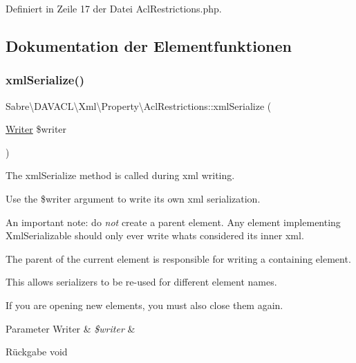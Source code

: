 Definiert in Zeile 17 der Datei Acl\+Restrictions.\+php.



\subsection{Dokumentation der Elementfunktionen}
\mbox{\label{class_sabre_1_1_d_a_v_a_c_l_1_1_xml_1_1_property_1_1_acl_restrictions_ab8c6081b610ad90690a1aca367a93ebe}} 
\subsubsection{\texorpdfstring{xml\+Serialize()}{xmlSerialize()}}
{\footnotesize\ttfamily Sabre\textbackslash{}\+D\+A\+V\+A\+C\+L\textbackslash{}\+Xml\textbackslash{}\+Property\textbackslash{}\+Acl\+Restrictions\+::xml\+Serialize (\begin{DoxyParamCaption}\item[{\mbox{\hyperlink{class_sabre_1_1_xml_1_1_writer}{Writer}}}]{\$writer }\end{DoxyParamCaption})}

The xml\+Serialize method is called during xml writing.

Use the \$writer argument to write its own xml serialization.

An important note\+: do {\itshape not} create a parent element. Any element implementing Xml\+Serializable should only ever write what\textquotesingle{}s considered its \textquotesingle{}inner xml\textquotesingle{}.

The parent of the current element is responsible for writing a containing element.

This allows serializers to be re-\/used for different element names.

If you are opening new elements, you must also close them again.


\begin{DoxyParams}[1]{Parameter}
Writer & {\em \$writer} & \\
\hline
\end{DoxyParams}
\begin{DoxyReturn}{Rückgabe}
void 
\end{DoxyReturn}


